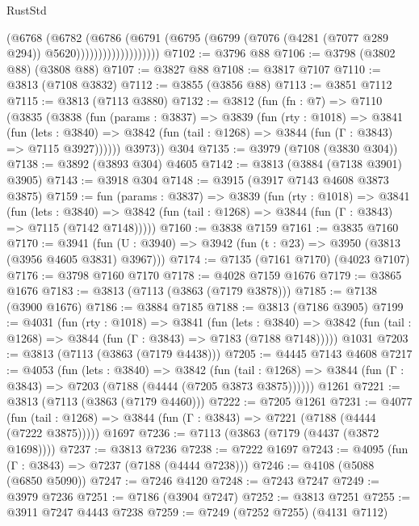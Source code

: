 \begin{lexlean}{RustStd}
\begin{coremodule}
{\begin{coremodule}
{{{{{{{{{{{{{{{{{{{{{{{{{{{{{{{{{{{                            (@6768
                              (@6782
                                (@6786
                                  (@6791
                                    (@6795
                                      (@6799
                                        (@7076 (@4281 (@7077 @289 @294)) @5620)))))))))))))))))))
@7102 := @3796 @88
@7106 := @3798 (@3802 @88) (@3808 @88)
@7107 := @3827 @88
@7108 := @3817 @7107
@7110 := @3813 (@7108 @3832)
@7112 := @3855 (@3856 @88)
@7113 := @3851 @7112
@7115 := @3813 (@7113 @3880)
@7132 := @3812
    (fun (fn : @7) =>
    @7110
      (@3835
        (@3838
          (fun (params : @3837) =>
          @3839
            (fun (rty : @1018) =>
            @3841
              (fun (lets : @3840) =>
              @3842 (fun (tail : @1268) => @3844 (fun (Γ : @3843) => @7115 @3927))))))
        @3973))
    @304
@7135 := @3979 (@7108 (@3830 @304))
@7138 := @3892 (@3893 @304) @4605
@7142 := @3813 (@3884 (@7138 @3901) @3905)
@7143 := @3918 @304
@7148 := @3915 (@3917 @7143 @4608 @3873 @3875)
@7159 := fun (params : @3837) =>
  @3839
    (fun (rty : @1018) =>
    @3841
      (fun (lets : @3840) =>
      @3842 (fun (tail : @1268) => @3844 (fun (Γ : @3843) => @7115 (@7142 @7148)))))
@7160 := @3838 @7159
@7161 := @3835 @7160
@7170 := @3941 (fun (U : @3940) => @3942 (fun (t : @23) => @3950 (@3813 (@3956 @4605 @3831) @3967)))
@7174 := @7135 (@7161 @7170) (@4023 @7107)
@7176 := @3798 @7160 @7170
@7178 := @4028 @7159 @1676
@7179 := @3865 @1676
@7183 := @3813 (@7113 (@3863 (@7179 @3878)))
@7185 := @7138 (@3900 @1676)
@7186 := @3884 @7185
@7188 := @3813 (@7186 @3905)
@7199 := @4031
    (fun (rty : @1018) =>
    @3841
      (fun (lets : @3840) =>
      @3842 (fun (tail : @1268) => @3844 (fun (Γ : @3843) => @7183 (@7188 @7148)))))
    @1031
@7203 := @3813 (@7113 (@3863 (@7179 @4438)))
@7205 := @4445 @7143 @4608
@7217 := @4053
    (fun (lets : @3840) =>
    @3842
      (fun (tail : @1268) => @3844 (fun (Γ : @3843) => @7203 (@7188 (@4444 (@7205 @3873 @3875))))))
    @1261
@7221 := @3813 (@7113 (@3863 (@7179 @4460)))
@7222 := @7205 @1261
@7231 := @4077
    (fun (tail : @1268) => @3844 (fun (Γ : @3843) => @7221 (@7188 (@4444 (@7222 @3875)))))
    @1697
@7236 := @7113 (@3863 (@7179 (@4437 (@3872 @1698))))
@7237 := @3813 @7236
@7238 := @7222 @1697
@7243 := @4095 (fun (Γ : @3843) => @7237 (@7188 (@4444 @7238)))
@7246 := @4108 (@5088 (@6850 @5090))
@7247 := @7246 @4120
@7248 := @7243 @7247
@7249 := @3979 @7236
@7251 := @7186 (@3904 @7247)
@7252 := @3813 @7251
@7255 := @3911 @7247 @4443 @7238
@7259 := @7249 (@7252 @7255) (@4131 @7112)
}}}}}}}}}}}}}}}}}}}}}}}}}}}}}}}}}}}
\end{coremodule}}
\end{coremodule}
\end{lexlean}
